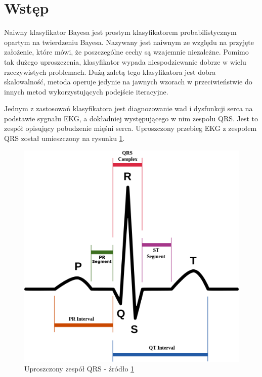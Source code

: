\section{Wstęp}


Naiwny klasyfikator Bayesa jest prostym klasyfikatorem probabilistycznym opartym na twierdzeniu Bayesa. Nazywany jest naiwnym ze względu na przyjęte założenie, które mówi, że poszczególne cechy są wzajemnie niezależne. Pomimo tak dużego uproszczenia, klasyfikator wypada niespodziewanie dobrze w wielu rzeczywistych problemach. Dużą zaletą tego klasyfikatora jest dobra skalowalność, metoda operuje jedynie na jawnych wzorach w przeciwieństwie do innych metod wykorzystujących podejście iteracyjne.

Jednym z zastosowań klasyfikatora jest diagnozowanie wad i dysfunkcji serca na podstawie sygnału EKG, a dokładniej występującego w nim zespołu QRS. Jest to zespół opisujący pobudzenie mięśni serca. Uproszczony przebieg EKG z zespołem QRS został umieszczony na rysunku \ref{fig_qrs}.

\begin{figure}[!htb]
  \begin{center}
    \includegraphics[scale = 0.25]
    {img/qrs.png}
  \end{center}
  \caption{Uproszczony zespół QRS - źródło \ref{}}
  \label{fig_qrs}
\end{figure}

